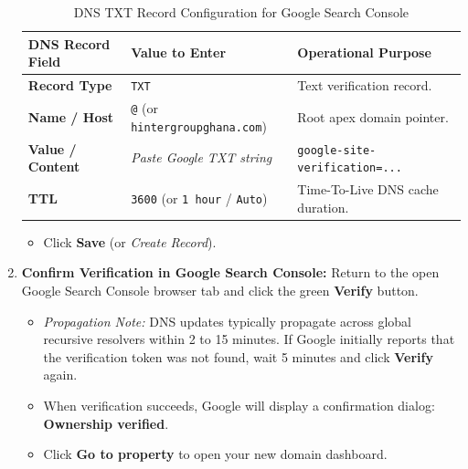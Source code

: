 \documentclass[11pt,a4paper,oneside]{book}
\begin{document}
\begin{enumerate}[leftmargin=*,label=\textbf{Step \arabic*:}]
    \begin{table}[H]
    \centering
    \small
    \begin{tabularx}{\textwidth}{llX}
      \toprule
      \textbf{DNS Record Field} & \textbf{Value to Enter} & \textbf{Operational Purpose} \\
      \midrule
      \textbf{Record Type} & \texttt{TXT} & Text verification record. \\
      \textbf{Name / Host} & \texttt{@} (or \texttt{hintergroupghana.com}) & Root apex domain pointer. \\
      \textbf{Value / Content} & \textit{Paste Google TXT string} & \texttt{google-site-verification=...} \\
      \textbf{TTL} & \texttt{3600} (or \texttt{1 hour} / \texttt{Auto}) & Time-To-Live DNS cache duration. \\
      \bottomrule
    \end{tabularx}
    \caption{DNS TXT Record Configuration for Google Search Console}
    \label{tab:dns_gsc}
    \end{table}

    \begin{itemize}[leftmargin=1.2cm]
      \item Click \textbf{Save} (or \textit{Create Record}).
    \end{itemize}

  \item \textbf{Confirm Verification in Google Search Console:}
    Return to the open Google Search Console browser tab and click the green \textbf{Verify} button.
    \begin{itemize}[leftmargin=1.2cm]
      \item \textit{Propagation Note:} DNS updates typically propagate across global recursive resolvers within 2 to 15 minutes. If Google initially reports that the verification token was not found, wait 5 minutes and click \textbf{Verify} again.
      \item When verification succeeds, Google will display a confirmation dialog: \textbf{Ownership verified}.
      \item Click \textbf{Go to property} to open your new domain dashboard.
    \end{itemize}


\end{enumerate}
\end{document}
